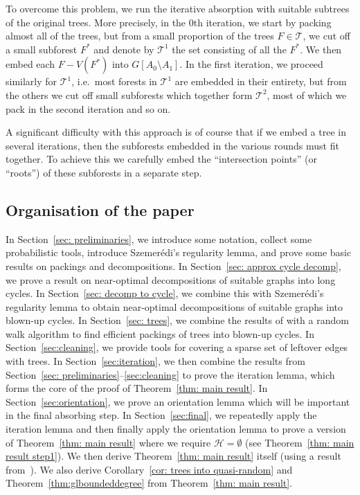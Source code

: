 \documentclass[a4paper, 11pt, reqno]{amsart}
\numberwithin{equation}{section}
\newcommand{\1}{{\rm 1\hspace*{-0.4ex}%
\rule{0.1ex}{1.52ex}\hspace*{0.2ex}}}
\newcommand{\cT}{\mathcal{T}}
\newcommand{\sm}{\setminus}
\newcounter{step}
\begin{document}
To overcome this problem, we run the iterative absorption with suitable subtrees of the original trees.
More precisely, in the $0$th iteration,
we start by packing almost all of the trees, but from a small proportion of the trees $F\in \cT$,
we cut off a small subforest $F^*$ and denote by $\cT^1$ the set consisting of all the $F^*$.
We then embed each $F-V(F^*)$ into $G[A_0\sm A_1]$.
In the first iteration,
we proceed similarly for $\cT^1$,
i.e.~most forests in $\cT^1$ are embedded in their entirety,
but from the others we cut off small subforests which together form $\cT^2$,
most of which we pack in the second iteration and so on.

A significant difficulty with this approach is of course that if we embed a tree in several iterations,
then the subforests embedded in the various rounds must fit together.
To achieve this we carefully embed the ``intersection points'' (or ``roots'') of these subforests in a separate step.


\subsection{Organisation of the paper}
In Section~\ref{sec: preliminaries},
we introduce some notation,
collect some probabilistic tools,
introduce  Szemer{\'e}di's regularity lemma,
and prove some basic results on packings and decompositions.
In Section~\ref{sec: approx cycle decomp},
we prove a result on near-optimal decompositions of suitable graphs into long cycles.
In Section~\ref{sec: decomp to cycle},
we combine this with Szemer{\'e}di's regularity lemma to obtain near-optimal decompositions of suitable graphs into blown-up cycles.
In Section~\ref{sec: trees},
we combine the results of \cite{KKOT16} with a random walk algorithm to find efficient packings of trees into blown-up cycles.
In Section~\ref{sec:cleaning},
we provide tools for covering a sparse set of leftover edges with trees.
In Section~\ref{sec:iteration},
we then combine the results from Section~\ref{sec: preliminaries}--\ref{sec:cleaning}
to prove the iteration lemma,
which forms the core of the proof of Theorem~\ref{thm: main result}.
In Section~\ref{sec:orientation},
we prove an orientation lemma which will be important in the final absorbing step.
In Section~\ref{sec:final},
we repeatedly apply the iteration lemma and then finally apply the orientation lemma
to prove a version of Theorem~\ref{thm: main result} where we require $\mathcal H=\emptyset$
(see Theorem~\ref{thm: main result step1}).
We then derive Theorem~\ref{thm: main result} itself (using a result from~\cite{KKOT16}).
We also derive  Corollary~\ref{cor: trees into quasi-random} and Theorem~\ref{thm:glboundeddegree}
from Theorem~\ref{thm: main result}.
\end{document}
